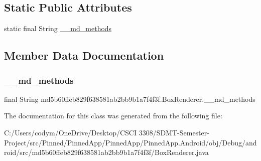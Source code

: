 \subsection*{Static Public Attributes}
\begin{DoxyCompactItemize}
\item 
static final String \hyperlink{classmd5b60ffeb829f638581ab2bb9b1a7f4f3f_1_1_box_renderer_a5d93612d5b0a73e4f90ab9f50db54f92}{\+\_\+\+\_\+md\+\_\+methods}
\end{DoxyCompactItemize}


\subsection{Member Data Documentation}
\mbox{\label{classmd5b60ffeb829f638581ab2bb9b1a7f4f3f_1_1_box_renderer_a5d93612d5b0a73e4f90ab9f50db54f92}} 
\subsubsection{\texorpdfstring{\+\_\+\+\_\+md\+\_\+methods}{\_\_md\_methods}}
{\footnotesize\ttfamily final String md5b60ffeb829f638581ab2bb9b1a7f4f3f.\+Box\+Renderer.\+\_\+\+\_\+md\+\_\+methods\hspace{0.3cm}{\ttfamily [static]}}



The documentation for this class was generated from the following file\+:\begin{DoxyCompactItemize}
\item 
C\+:/\+Users/codym/\+One\+Drive/\+Desktop/\+C\+S\+C\+I 3308/\+S\+D\+M\+T-\/\+Semester-\/\+Project/src/\+Pinned/\+Pinned\+App/\+Pinned\+App/\+Pinned\+App.\+Android/obj/\+Debug/android/src/md5b60ffeb829f638581ab2bb9b1a7f4f3f/Box\+Renderer.\+java\end{DoxyCompactItemize}
